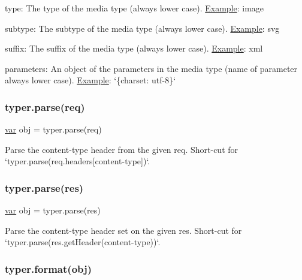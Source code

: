\begin{DoxyItemize}
\item {\ttfamily type}\+: The type of the media type (always lower case). \hyperlink{struct_example}{Example}\+: {\ttfamily \textquotesingle{}image\textquotesingle{}}
\item {\ttfamily subtype}\+: The subtype of the media type (always lower case). \hyperlink{struct_example}{Example}\+: {\ttfamily \textquotesingle{}svg\textquotesingle{}}
\item {\ttfamily suffix}\+: The suffix of the media type (always lower case). \hyperlink{struct_example}{Example}\+: {\ttfamily \textquotesingle{}xml\textquotesingle{}}
\item {\ttfamily parameters}\+: An object of the parameters in the media type (name of parameter always lower case). \hyperlink{struct_example}{Example}\+: `\{charset\+: \textquotesingle{}utf-\/8\textquotesingle{}\}`
\end{DoxyItemize}

\subsubsection*{typer.\+parse(req)}


\begin{DoxyCode}
\hyperlink{018__def_8c_a335628f2e9085305224b4f9cc6e95ed5}{var} obj = typer.parse(req)
\end{DoxyCode}


Parse the {\ttfamily content-\/type} header from the given {\ttfamily req}. Short-\/cut for `typer.parse(req.\+headers\mbox{[}\textquotesingle{}content-\/type\textquotesingle{}\mbox{]})`.

\subsubsection*{typer.\+parse(res)}


\begin{DoxyCode}
\hyperlink{018__def_8c_a335628f2e9085305224b4f9cc6e95ed5}{var} obj = typer.parse(res)
\end{DoxyCode}


Parse the {\ttfamily content-\/type} header set on the given {\ttfamily res}. Short-\/cut for `typer.parse(res.\+get\+Header(\textquotesingle{}content-\/type\textquotesingle{}))`.

\subsubsection*{typer.\+format(obj)}


